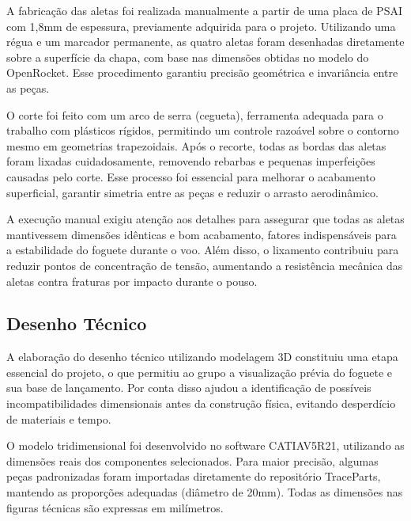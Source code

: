 A fabricação das aletas foi realizada manualmente a partir de uma placa de PSAI com 1,8mm de espessura, previamente adquirida para o projeto. Utilizando uma régua e um marcador permanente, as quatro aletas foram desenhadas diretamente sobre a superfície da chapa, com base nas dimensões obtidas no modelo do OpenRocket. Esse procedimento garantiu precisão geométrica e invariância entre as peças. 

O corte foi feito com um arco de serra (cegueta), ferramenta adequada para o trabalho com plásticos rígidos, permitindo um controle razoável sobre o contorno mesmo em geometrias trapezoidais. Após o recorte, todas as bordas das aletas foram lixadas cuidadosamente, removendo rebarbas e pequenas imperfeições causadas pelo corte. Esse processo foi essencial para melhorar o acabamento superficial, garantir simetria entre as peças e reduzir o arrasto aerodinâmico. 

A execução manual exigiu atenção aos detalhes para assegurar que todas as aletas mantivessem dimensões idênticas e bom acabamento, fatores indispensáveis para a estabilidade do foguete durante o voo. Além disso, o lixamento contribuiu para reduzir pontos de concentração de tensão, aumentando a resistência mecânica das aletas contra fraturas por impacto durante o pouso. 

\subsection{Desenho Técnico}

A elaboração do desenho técnico utilizando modelagem 3D constituiu uma etapa essencial do projeto, o que permitiu ao grupo a visualização prévia do foguete e sua base de lançamento. Por conta disso ajudou a identificação de possíveis incompatibilidades dimensionais antes da construção física, evitando desperdício de materiais e tempo.

O modelo tridimensional foi desenvolvido no software CATIAV5R21, utilizando as dimensões reais dos componentes selecionados. Para maior precisão, algumas peças padronizadas foram importadas diretamente do repositório TraceParts, mantendo as proporções adequadas (diâmetro de 20mm). Todas as dimensões nas figuras técnicas são expressas em milímetros.


